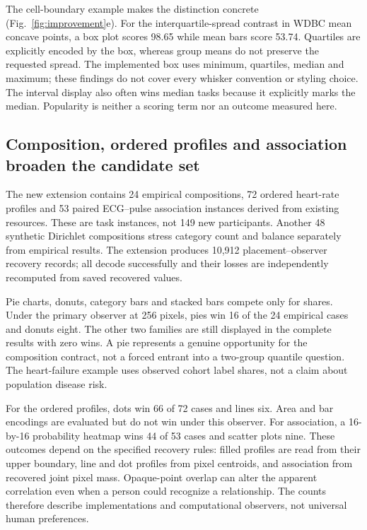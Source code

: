 \documentclass[11pt]{article}
\begin{document}
The cell-boundary example makes the distinction concrete (Fig.~\ref{fig:improvement}e). For the interquartile-spread contrast in WDBC mean concave points, a box plot scores 98.65 while mean bars score 53.74. Quartiles are explicitly encoded by the box, whereas group means do not preserve the requested spread. The implemented box uses minimum, quartiles, median and maximum; these findings do not cover every whisker convention or styling choice. The interval display also often wins median tasks because it explicitly marks the median. Popularity is neither a scoring term nor an outcome measured here.

\subsection*{Composition, ordered profiles and association broaden the candidate set}
The new extension contains 24 empirical compositions, 72 ordered heart-rate profiles and 53 paired ECG--pulse association instances derived from existing resources. These are task instances, not 149 new participants. Another 48 synthetic Dirichlet compositions stress category count and balance separately from empirical results. The extension produces 10,912 placement--observer recovery records; all decode successfully and their losses are independently recomputed from saved recovered values.

Pie charts, donuts, category bars and stacked bars compete only for shares. Under the primary observer at 256 pixels, pies win 16 of the 24 empirical cases and donuts eight. The other two families are still displayed in the complete results with zero wins. A pie represents a genuine opportunity for the composition contract, not a forced entrant into a two-group quantile question. The heart-failure example uses observed cohort label shares, not a claim about population disease risk.

For the ordered profiles, dots win 66 of 72 cases and lines six. Area and bar encodings are evaluated but do not win under this observer. For association, a 16-by-16 probability heatmap wins 44 of 53 cases and scatter plots nine. These outcomes depend on the specified recovery rules: filled profiles are read from their upper boundary, line and dot profiles from pixel centroids, and association from recovered joint pixel mass. Opaque-point overlap can alter the apparent correlation even when a person could recognize a relationship. The counts therefore describe implementations and computational observers, not universal human preferences.
\end{document}
